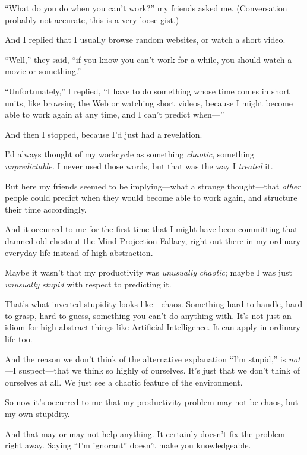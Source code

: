 {
 ``What do you do when you can't
work?'' my friends asked me. (Conversation probably
not accurate, this is a very loose gist.)}

{
 And I replied that I usually browse random websites, or watch a
short video.}

{
 ``Well,'' they said,
``if you know you can't work for a
while, you should watch a movie or something.''}

{
 ``Unfortunately,'' I replied,
``I have to do something whose time comes in short
units, like browsing the Web or watching short videos, because I might
become able to work again at any time, and I can't
predict when---''}

{
 And then I stopped, because I'd just had a
revelation.}

{
 I'd always thought of my workcycle as something
\textit{chaotic}, something \textit{unpredictable.} I never used those
words, but that was the way I \textit{treated} it.}

{
 But here my friends seemed to be implying---what a strange
thought---that \textit{other} people could predict when they would
become able to work again, and structure their time accordingly.}

{
 And it occurred to me for the first time that I might have been
committing that damned old chestnut the Mind Projection Fallacy, right
out there in my ordinary everyday life instead of high abstraction.}

{
 Maybe it wasn't that my productivity was
\textit{unusually} \textit{chaotic}; maybe I was just
\textit{unusually} \textit{stupid} with respect to predicting it.}

{
 That's what inverted stupidity looks like---chaos.
Something hard to handle, hard to grasp, hard to guess, something you
can't do anything with. It's not just
an idiom for high abstract things like Artificial Intelligence. It can
apply in ordinary life too.}

{
 And the reason we don't think of the alternative
explanation ``I'm
stupid,'' is \textit{not}{}---I suspect---that we
think so highly of ourselves. It's just that we
don't think of ourselves at all. We just see a chaotic
feature of the environment.}

{
 So now it's occurred to me that my productivity
problem may not be chaos, but my own stupidity.}

{
 And that may or may not help anything. It certainly
doesn't fix the problem right away. Saying
``I'm ignorant''
doesn't make you knowledgeable.}

